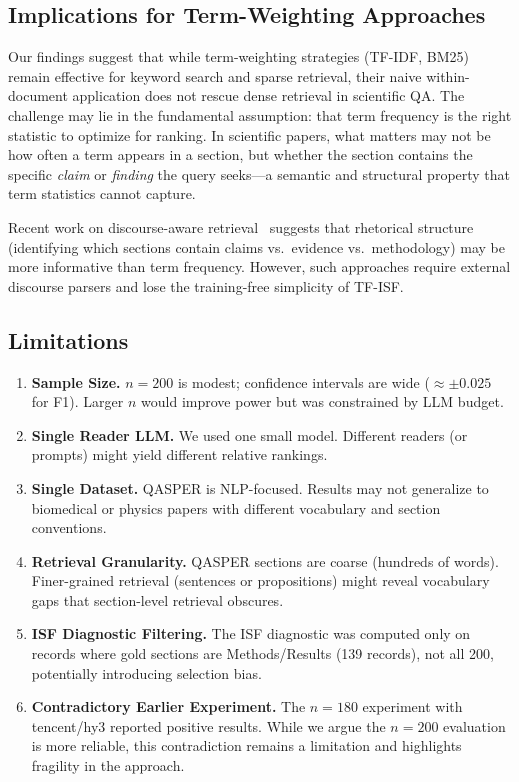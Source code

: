 \documentclass[11pt,letterpaper]{article}
\begin{document}
\subsection{Implications for Term-Weighting Approaches}

Our findings suggest that while term-weighting strategies (TF-IDF, BM25) remain
effective for keyword search and sparse retrieval, their naive within-document
application does not rescue dense retrieval in scientific QA. The challenge may
lie in the fundamental assumption: that term frequency is the right statistic to
optimize for ranking. In scientific papers, what matters may not be how often a
term appears in a section, but whether the section contains the specific
\emph{claim} or \emph{finding} the query seeks—a semantic and structural property
that term statistics cannot capture.

Recent work on discourse-aware retrieval~\citep{Wang2025} suggests that rhetorical
structure (identifying which sections contain claims vs.\ evidence vs.\
methodology) may be more informative than term frequency. However, such approaches
require external discourse parsers and lose the training-free simplicity of
TF-ISF.

\subsection{Limitations}

\begin{enumerate}
  \item \textbf{Sample Size.} $n{=}200$ is modest; confidence intervals are wide
  ($\approx \pm 0.025$ for F1). Larger $n$ would improve power but was constrained
  by LLM budget.

  \item \textbf{Single Reader LLM.} We used one small model. Different readers
  (or prompts) might yield different relative rankings.

  \item \textbf{Single Dataset.} QASPER is NLP-focused. Results may not generalize
  to biomedical or physics papers with different vocabulary and section conventions.

  \item \textbf{Retrieval Granularity.} QASPER sections are coarse (hundreds of
  words). Finer-grained retrieval (sentences or propositions) might reveal
  vocabulary gaps that section-level retrieval obscures.

  \item \textbf{ISF Diagnostic Filtering.} The ISF diagnostic was computed only
  on records where gold sections are Methods/Results (139 records), not all 200,
  potentially introducing selection bias.

  \item \textbf{Contradictory Earlier Experiment.} The $n{=}180$ experiment with
  tencent/hy3 reported positive results. While we argue the $n{=}200$ evaluation
  is more reliable, this contradiction remains a limitation and highlights
  fragility in the approach.
\end{enumerate}
\end{document}
